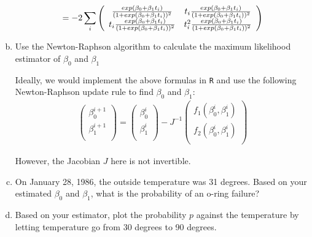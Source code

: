\documentclass[12pt]{article}
\begin{document}
\begin{enumerate}[(a)]
 \begin{align*}
 = -2 \sum_i
\left( {\begin{array}{*{20}c}
\frac{exp(\beta_0 + \beta_1 t_i) } { (1 + exp(\beta_0 + \beta_1 t_i))^2 } & t_i \frac{exp(\beta_0 + \beta_1 t_i) } { (1 + exp(\beta_0 + \beta_1 t_i))^2 }\\
t_i \frac{exp(\beta_0 + \beta_1 t_i) } { (1 + exp(\beta_0 + \beta_1 t_i))^2 } & t_i^2 \frac{exp(\beta_0 + \beta_1 t_i) } { (1 + exp(\beta_0 + \beta_1 t_i))^2 }\\
 \end{array} } \right)
\end{align*}






\item Use the Newton-Raphson algorithm to calculate the maximum likelihood estimator of $\beta_0$ and $\beta_1$

Ideally, we would implement the above formulas in \texttt{R} and use the following Newton-Raphson update rule to find $\beta_0$ and $\beta_1$:
\begin{align*}
\left(
\begin{array}{c} 
   \beta_0^{i+1} \\
   \beta_1^{i+1}\\ 
\end{array}
\right)
=
\left(
\begin{array}{c} 
   \beta_0^{i} \\
   \beta_1^{i}\\ 
\end{array}
\right)
- J^{-1} 
\left(
\begin{array}{c} 
   f_1(\beta_0^{i}, \beta_1^{i} ) \\
   f_2(\beta_0^{i}, \beta_1^{i} ) \\
\end{array}
\right)
\end{align*} 

However, the Jacobian $J$ here is not invertible. 


\item On January 28, 1986, the outside temperature was 31 degrees. Based on your estimated $\beta_0$ and $\beta_1$, what is the probability of an o-ring failure?

\item Based on your estimator, plot the probability $p$ against the temperature by letting temperature go from 30 degrees to 90 degrees.

\end{enumerate}
\end{document}
